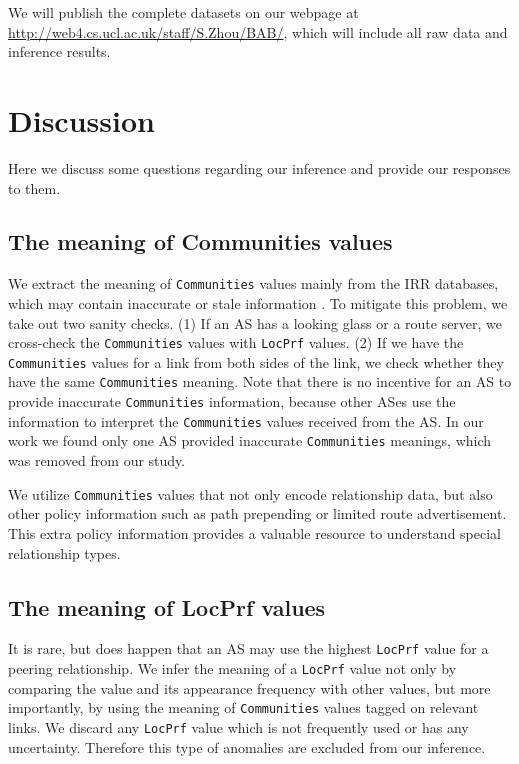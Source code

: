 \documentclass[conference]{IEEEtran}
\begin{document}
We will publish the complete datasets on our webpage at \url{http://web4.cs.ucl.ac.uk/staff/S.Zhou/BAB/}, which will include all raw data and inference results. 

\section{Discussion}

Here we discuss some questions regarding our inference and provide our responses to them. 

\subsection{The meaning of  {Communities}  values}

We extract the meaning of  {\tt Communities}  values mainly from the IRR databases, which may contain inaccurate or stale information \cite{siganos:2004}.
To mitigate this problem, we take out two sanity checks. (1) If an AS has a looking glass or a route server, we cross-check the {\tt Communities} values with {\tt LocPrf} values. (2) If we have the {\tt Communities} values for a link from both sides of the link, we check whether they have the same {\tt Communities} meaning.  Note that there is no incentive for an AS to provide inaccurate {\tt Communities} information, because other ASes use the information to interpret the {\tt Communities} values received from the AS. In our work we found only one AS provided inaccurate {\tt Communities} meanings, which was removed from our study. 

We utilize {\tt Communities} values that not only encode relationship data, but also other policy information such as path prepending or limited route advertisement. This extra policy information provides a valuable resource to understand special relationship types.

\subsection{The meaning of  {LocPrf}  values}

It is rare, but does happen that an AS may use the highest  {\tt LocPrf} value for a peering relationship. We  infer the meaning of a {\tt LocPrf} value not only by comparing the value and its appearance frequency with other values, but more importantly, by using the meaning of {\tt Communities} values tagged on relevant links. We  discard any  {\tt LocPrf} value which is not frequently used or has any uncertainty. Therefore this type of anomalies are excluded from our inference.
\end{document}

